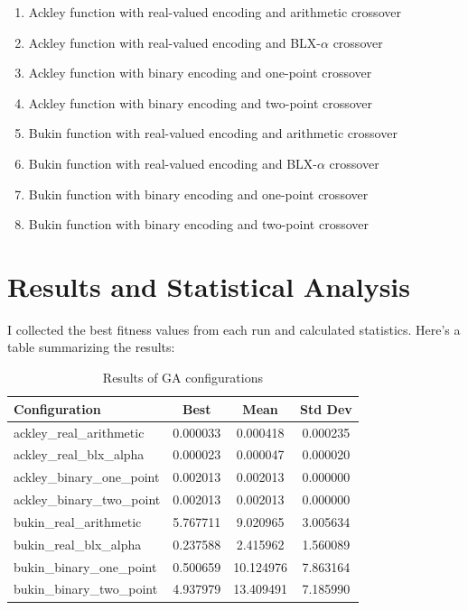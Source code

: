 \documentclass{article}
\begin{document}
\begin{enumerate}
\item Ackley function with real-valued encoding and arithmetic crossover
\item Ackley function with real-valued encoding and BLX-$\alpha$ crossover
\item Ackley function with binary encoding and one-point crossover
\item Ackley function with binary encoding and two-point crossover
\item Bukin function with real-valued encoding and arithmetic crossover
\item Bukin function with real-valued encoding and BLX-$\alpha$ crossover
\item Bukin function with binary encoding and one-point crossover
\item Bukin function with binary encoding and two-point crossover
\end{enumerate}

\section{Results and Statistical Analysis}
I collected the best fitness values from each run and calculated statistics. Here's a table summarizing the results:

\begin{table}[H]
\centering
\begin{tabular}{lccc}
\toprule
Configuration & Best & Mean & Std Dev \\
\midrule
ackley\_real\_arithmetic & 0.000033 & 0.000418 & 0.000235 \\
ackley\_real\_blx\_alpha & 0.000023 & 0.000047 & 0.000020 \\
ackley\_binary\_one\_point & 0.002013 & 0.002013 & 0.000000 \\
ackley\_binary\_two\_point & 0.002013 & 0.002013 & 0.000000 \\
bukin\_real\_arithmetic & 5.767711 & 9.020965 & 3.005634 \\
bukin\_real\_blx\_alpha & 0.237588 & 2.415962 & 1.560089 \\
bukin\_binary\_one\_point & 0.500659 & 10.124976 & 7.863164 \\
bukin\_binary\_two\_point & 4.937979 & 13.409491 & 7.185990 \\
\bottomrule
\end{tabular}
\caption{Results of GA configurations}
\label{tab:results}
\end{table}
\end{document}
